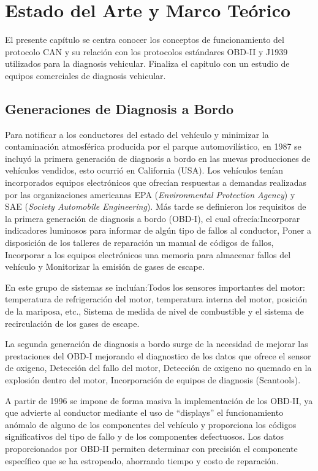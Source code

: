 \chapter[Marco Teórico y Fundamentos]{Estado del Arte y Marco Teórico}

El presente capítulo se centra conocer los conceptos de funcionamiento del protocolo CAN y su relación con los protocolos estándares OBD-II y J1939 utilizados para la diagnosis vehicular. Finaliza el capitulo con un estudio de  equipos comerciales de diagnosis vehicular. 


\section{Generaciones de Diagnosis a Bordo}

Para notificar a los conductores del estado del vehículo y minimizar la contaminación atmosférica producida por el parque automovilístico, en 1987 se incluyó la primera generación de diagnosis a bordo en las nuevas producciones de vehículos vendidos, esto ocurrió en California (USA). 
Los vehículos tenían incorporados equipos electrónicos que ofrecían respuestas a demandas realizadas por las organizaciones americanas EPA (\textit{Environmental Protection Agency}) y SAE (\textit{Society Automobile Engineering}). 
Más tarde se definieron los requisitos de la primera generación de diagnosis a bordo (OBD-I), el cual ofrecía:Incorporar indicadores luminosos para informar de algún tipo de fallos al conductor, Poner a disposición de los talleres de reparación un manual de códigos de fallos, Incorporar a los equipos electrónicos una memoria para almacenar fallos del vehículo y Monitorizar la emisión de gases de escape.

En este grupo de sistemas se incluían:Todos los sensores importantes del motor: temperatura de refrigeración del motor, temperatura interna del motor, posición de la mariposa, etc., Sistema de medida de nivel de combustible y el sistema de recirculación de los gases de escape.

La segunda generación de diagnosis a bordo surge de la necesidad de mejorar las prestaciones del OBD-I mejorando el diagnostico de los datos que ofrece el sensor de oxigeno, Detección del fallo del motor, Detección de oxigeno no quemado en la explosión dentro del motor, Incorporación de equipos de diagnosis (Scantools). 

A partir de 1996 se impone de forma masiva la implementación de los OBD-II, ya que advierte al conductor mediante  el uso de “displays” el funcionamiento anómalo de alguno de los componentes del vehículo y proporciona los códigos significativos del tipo de fallo y de los componentes defectuosos.  Los datos proporcionados por OBD-II permiten determinar con precisión el componente específico que se ha estropeado, ahorrando tiempo y costo de reparación. 

